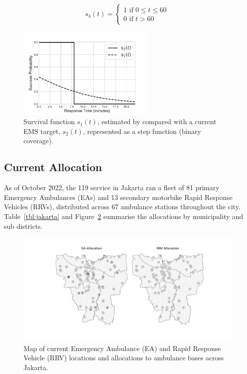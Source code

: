 \documentclass[preprint,12pt]{elsarticle}
\begin{document}
\begin{equation}\label{eqn:survival_cutoff_60}
    s_4(t) = \begin{cases} 
    1 \text{ if } 0\leq t \leq 60 \\
    0 \text{ if } t > 60 
    \end{cases}
\end{equation}

\begin{figure}[ht]
\centering
  \includegraphics[width=0.6\textwidth]{img/Survival_Function_(new).pdf}
    \caption{Survival function $s_1(t)$, estimated by \cite{Valenzuela20001206} compared with a current EMS target, $s_2(t)$, represented as a step function (binary coverage).}
  \label{fig:survivalfunction}
\end{figure}


\subsection{Current Allocation}\label{sec:analysis_current}
As of October 2022, the 119 service in Jakarta ran a fleet of 81 primary Emergency Ambulances (EAs) and 13 secondary motorbike Rapid Response Vehicles (RRVs), distributed across 67 ambulance stations throughout the city. Table~\ref{tbl:jakarta} and Figure~\ref{fig:current_allocation} summarise the allocations by municipality and sub districts. 

\begin{figure}
\begin{center}
\includegraphics[width=\textwidth]{img/map_current}
\caption{Map of current Emergency Ambulance (EA) and Rapid Response Vehicle (RRV) locations and allocations to ambulance bases across Jakarta.}
\label{fig:current_allocation}
\end{center}
\end{figure}
\end{document}
